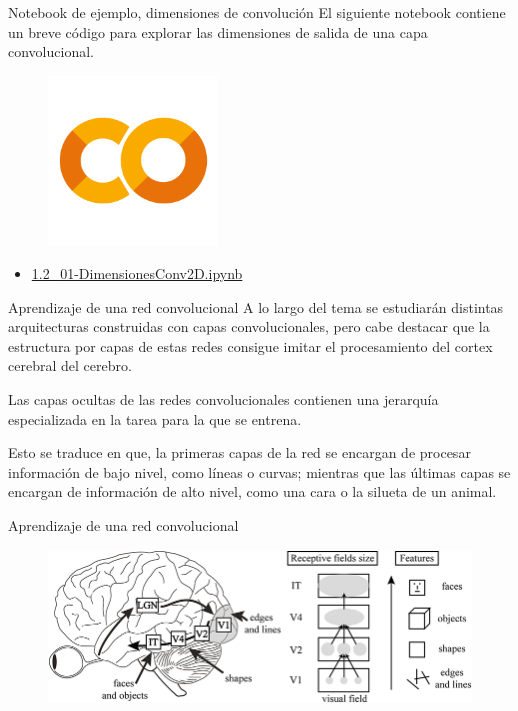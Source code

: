 \begin{frame}{Notebook de ejemplo, dimensiones de convolución}
El siguiente notebook contiene un breve código para explorar las \alert{dimensiones de salida} de una capa convolucional.

\begin{figure}
    \centering
    \includegraphics[width=0.4\textwidth]{Slides/figures/GoogleColab.png}
\end{figure}
\begin{itemize}
    \centering
    \item {\Large \href{https://colab.research.google.com/github/guillermoih/M-todos-Generativos/blob/main/Notebooks/1.2_01-DimensionesConv2D.ipynb}{1.2\_01-DimensionesConv2D.ipynb}}
\end{itemize}
\end{frame}

\begin{frame}{Aprendizaje de una red convolucional}
A lo largo del tema se estudiarán distintas \alert{arquitecturas} construidas con capas convolucionales, pero cabe destacar que la \alert{estructura por capas} de estas redes consigue \alert{imitar} el procesamiento del \alert{cortex cerebral} del cerebro.

Las capas \alert{ocultas} de las redes convolucionales contienen una \alert{jerarquía} especializada en la tarea para la que se entrena.

Esto se traduce en que, la \alert{primeras} capas de la red se encargan de procesar información de \alert{bajo nivel}, como \alert{líneas} o \alert{curvas}; mientras que las \alert{últimas} capas se encargan de información de \alert{alto nivel}, como una cara o la silueta de un animal.
\end{frame}

\begin{frame}{Aprendizaje de una red convolucional}
\begin{figure}
    \centering
    \includegraphics[width=\textwidth]{Slides/figures/Tema 3/Cortex.jpg}
    \caption{\cite{Cortex}}
\end{figure}
\end{frame}

